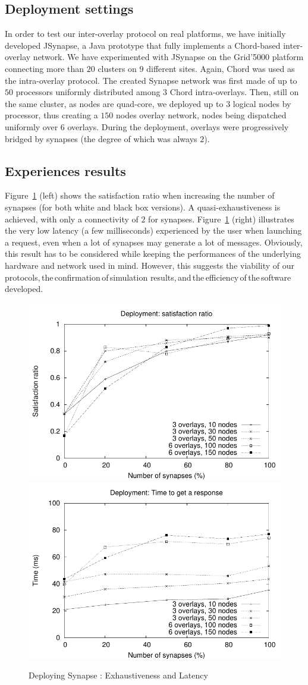 \subsection{Deployment settings}
%
In order to test our inter-overlay protocol on real platforms, we have
initially developed JSynapse, a Java prototype that fully
implements a Chord-based inter-overlay network.  We have experimented
with JSynapse on the Grid'5000 platform connecting more than $20$
clusters on $9$ different sites. Again, Chord was used as the
intra-overlay protocol.  The created Synapse network was first made of
up to $50$ processors uniformly distributed among $3$ Chord
intra-overlays. Then, still on the same cluster, as nodes are
quad-core, we deployed up to $3$ logical nodes by processor, thus
creating a $150$ nodes overlay network, nodes being dispatched
uniformly over $6$ overlays. During the deployment, overlays were
progressively bridged by synapses (the degree of which was always
$2$).

\subsection{Experiences results}
%
Figure~\ref{dep:1-sat} (left) shows the satisfaction ratio when
increasing the number of synapses (for both white and black box
versions). A quasi-exhaustiveness is achieved, with only
a connectivity of $2$ for synapses.
Figure~\ref{dep:1-sat} (right) illustrates the very low latency (a few
milliseconds) experienced by the user when launching a request, even
when a lot of synapses may generate a lot of messages. Obviously, this
result has to be considered while keeping the performances of the
underlying hardware and network used in mind. However, this suggests
the viability of our protocols,\,the\,confirmation\,of\,simulation
results,\,and\,the\,efficiency\,of\,the\,software\,developed.
%
\begin{figure}[!t]
  \includegraphics[width=0.5\linewidth]{fig/dep1-sat.pdf}
  \includegraphics[width=0.5\linewidth]{fig/dep1-time.pdf}
  \caption{Deploying Synapse : Exhaustiveness and Latency \label{dep:1-sat}}
\end{figure}

